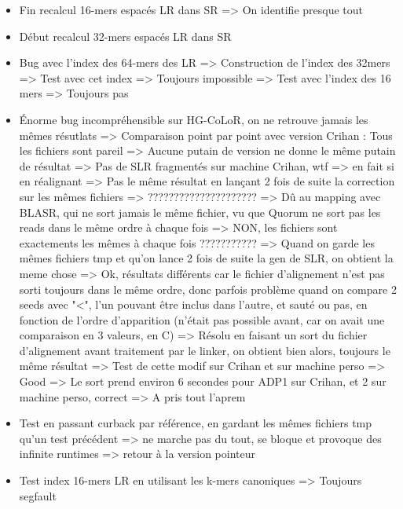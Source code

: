 \documentclass[12pt]{report}
\begin{document}
\begin{itemize}
	\item Fin recalcul 16-mers espacés LR dans SR => On identifie presque tout
	
	\item Début recalcul 32-mers espacés LR dans SR
	
	\item Bug avec l'index des 64-mers des LR
			=> Construction de l'index des 32mers
			=> Test avec cet index => Toujours impossible
			=> Test avec l'index des 16 mers => Toujours pas
	
	\item Énorme bug incompréhensible sur HG-CoLoR, on ne retrouve jamais les mêmes résutlats
			=> Comparaison point par point avec version Crihan : Tous les fichiers sont pareil
			=> Aucune putain de version ne donne le même putain de résultat
			=> Pas de SLR fragmentés sur machine Crihan, wtf => en fait si en réalignant 
			=> Pas le même résultat en lançant 2 fois de suite la correction sur les mêmes fichiers => ?????????????????????
			=> Dû au mapping avec BLASR, qui ne sort jamais le même fichier, vu que Quorum ne sort pas les reads dans le même ordre à chaque fois
				=> NON, les fichiers sont exactements les mêmes à chaque fois ???????????
			=> Quand on garde les mêmes fichiers tmp et qu'on lance 2 fois de suite la gen de SLR, on obtient la meme chose
			=> Ok, résultats différents car le fichier d'alignement n'est pas sorti toujours dans le même ordre,
			   donc parfois problème quand on compare 2 seeds avec "<", l'un pouvant être inclus dans l'autre, et sauté ou pas, en fonction de l'ordre
			   d'apparition (n'était pas possible avant, car on avait une comparaison en 3 valeurs, en C)
			   => Résolu en faisant un sort du fichier d'alignement avant traitement par le linker, on obtient bien alors, toujours le même résultat
			   => Test de cette modif sur Crihan et sur machine perso => Good
			   => Le sort prend environ 6 secondes pour ADP1 sur Crihan, et 2 sur machine perso, correct
			=> A pris tout l'aprem
			  
	\item Test en passant curback par référence, en gardant les mêmes fichiers tmp qu'un test précédent
			=> ne marche pas du tout, se bloque et provoque des infinite runtimes
			=> retour à la version pointeur
	
	\item Test index 16-mers LR en utilisant les k-mers canoniques => Toujours segfault
\end{itemize}
\end{document}
